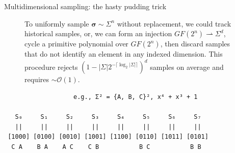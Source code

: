 \documentclass{beamer}
\begin{document}
\begin{frame}[fragile]{Multidimensional sampling: the hasty pudding trick}
\begin{figure}
\begin{minipage}[l]{5cm}
        \end{minipage}\hspace{1cm}
        \begin{minipage}[c]{5.5cm}
        To uniformly sample $\bm\sigma \sim \Sigma^n$ without replacement, we could track historical samples, or, we can form an injection $GF(2^n)\rightharpoonup\Sigma^d$, cycle a primitive polynomial over $GF(2^n)$, then discard samples that do not identify an element in any indexed dimension. This procedure rejects $(1 - |\Sigma|2^{-\lceil\log_2|\Sigma|\rceil})^d$ samples on average and requires $\sim\mathcal{O}(1)$.
        \end{minipage}
        \end{figure}
        \begin{small}
            \begin{verbatim}
                   e.g., Σ² = {A, B, C}², x⁴ + x³ + 1

   S₀     S₁     S₂     S₃     S₄     S₅     S₆     S₇
   ||     ||     ||     ||     ||     ||     ||     ||
 [1000] [0100] [0010] [1001] [1100] [0110] [1011] [0101]
  C A    B A    A C    C B           B C           B B
            \end{verbatim}
        \end{small}
    \egroup
    \end{frame}
\end{document}
